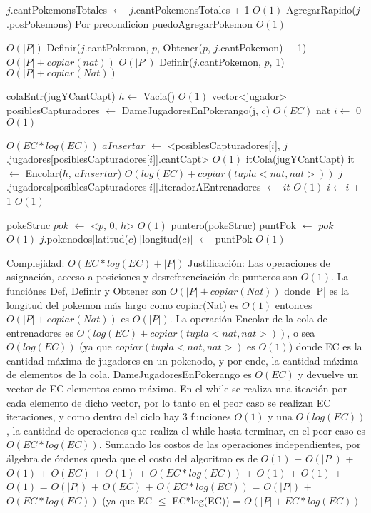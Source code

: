 \begin{Algoritmos}
\begin{algorithm}[H]
\begin{algorithmic}[1]
\State $j$.cantPokemonsTotales $\gets$ $j$.cantPokemonsTotales + 1 \Comment $O(1)$
\State AgregarRapido($j$.posPokemons) \Comment Por precondicion puedoAgregarPokemon $O(1)$

 \Comment $O(|P|)$
  \State Definir($j$.cantPokemon, $p$, Obtener($p$, $j$.cantPokemon) + 1) \Comment $O(|P| + copiar(nat))$
\EndIf
{}  \Comment $O(|P|)$
  \State Definir($j$.cantPokemon, $p$, 1)  \Comment $O(|P| + copiar(Nat))$
\EndIf

\State colaEntr(jugYCantCapt) $h \gets$ Vacia() \Comment $O(1)$
\State vector<jugador> \hspace{0.5mm} posiblesCapturadores $\gets$ DameJugadoresEnPokerango(j, c) \Comment $O(EC)$
\State nat $i \gets$ 0 \Comment $O(1)$

 \Comment $O(EC*log(EC))$
  \State $aInsertar$ $\gets$ <posiblesCapturadores[$i$], $j$.jugadores[posiblesCapturadores[$i$]].cantCapt> \Comment $O(1)$
  \State itCola(jugYCantCapt) it $\gets$ Encolar($h$, $aInsertar$) \Comment $O(log(EC) + copiar(tupla <nat, nat>))$
  \State $j$.jugadores[posiblesCapturadores[$i$]].iteradorAEntrenadores $\gets$ $it$ \Comment $O(1)$
  \State $i \gets i$ + 1 \Comment $O(1)$
\EndWhile

\State pokeStruc $pok$ $\gets$ <$p$, 0, $h$> \Comment $O(1)$
\State puntero(pokeStruc) puntPok $\gets$ $pok$ \Comment $O(1)$
\State $j$.pokenodos[latitud($c$)][longitud($c$)] $\gets$ puntPok \Comment $O(1)$

\medskip
\State \underline{Complejidad:} $O(EC*log(EC) + |P|)$ 
\State \underline{Justificaci\'on:} Las operaciones de asignaci\'on, acceso a posiciones y desreferenciaci\'on de punteros son $O(1)$. La funci\'ones Def, Definir y Obtener son $O(|P| + copiar(Nat))$ donde |P| es la longitud del pokemon m\'as largo como copiar(Nat) es $O(1)$ entonces $O(|P| + copiar(Nat))$  es $O(|P|)$. La operaci\'on Encolar de la cola de entrenadores es $O(log(EC) + copiar(tupla <nat, nat>))$, o sea $O(log(EC))$ (ya que $copiar(tupla <nat, nat>)$ es $O(1)$) donde EC es la cantidad m\'axima de jugadores en un pokenodo, y por ende, la cantidad m\'axima de elementos de la cola. DameJugadoresEnPokerango es $O(EC)$ y devuelve un vector de EC elementos como m\'aximo. En el while se realiza una iteaci\'on por cada elemento de dicho vector, por lo tanto en el peor caso se realizan EC iteraciones, y como dentro del ciclo hay 3 funciones $O(1)$ y una $O(log(EC))$, la cantidad de operaciones que realiza el while hasta terminar, en el peor caso es $O(EC*log(EC))$. Sumando los costos de las operaciones independientes, por \'algebra de \'ordenes queda que el costo del algoritmo es de $O(1)$ + $O(|P|)$ + $O(1)$ + $O(EC)$ + $O(1)$ + $O(EC*log(EC))$ + $O(1)$ + $O(1)$ + $O(1)$ = $O(|P|)$ + $O(EC)$ + $O(EC*log(EC))$ = $O(|P|)$ + $O(EC*log(EC))$ (ya que EC $\leq$ EC*log(EC)) = $O(|P| + EC*log(EC))$


\end{algorithmic}
\end{algorithm}
\end{Algoritmos}
